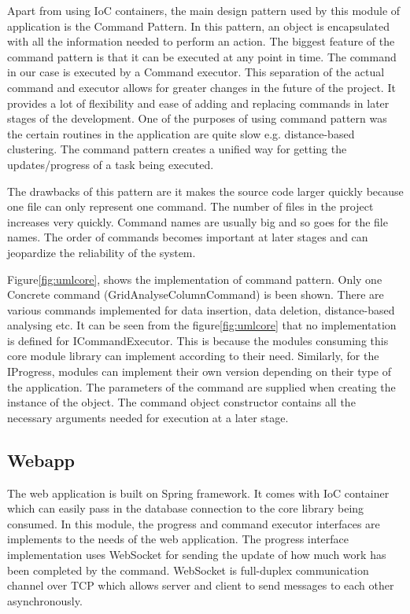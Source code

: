 Apart from using IoC containers, the main design pattern used by this module of application is the Command Pattern\cite{dupire2001command}. In this pattern, an object is encapsulated with all the information needed to perform an action. The biggest feature of the command pattern is that it can be executed at any point in time. The command in our case is executed by a Command executor. This separation of the actual command and executor allows for greater changes in the future of the project. It provides a lot of flexibility and ease of adding and replacing commands in later stages of the development. One of the purposes of using command pattern was the certain routines in the application are quite slow e.g. distance-based clustering. The command pattern creates a unified way for getting the updates/progress of a task being executed.

The drawbacks of this pattern are it makes the source code larger quickly because one file can only represent one command. The number of files in the project increases very quickly. Command names are usually big and so goes for the file names. The order of commands becomes important at later stages and can jeopardize the reliability of the system\cite{dupire2001command}.

Figure\ref{fig:umlcore}, shows the implementation of command pattern. Only one Concrete command (GridAnalyseColumnCommand) is been shown. There are various commands implemented for data insertion, data deletion, distance-based analysing etc. It can be seen from the figure\ref{fig:umlcore} that no implementation is defined for ICommandExecutor. This is because the modules consuming this core module library can implement according to their need. Similarly, for the IProgress, modules can implement their own version depending on their type of the application. The parameters of the command are supplied when creating the instance of the object. The command object constructor contains all the necessary arguments needed for execution at a later stage.

\subsection{Webapp}

The web application is built on Spring framework. It comes with IoC container which can easily pass in the database connection to the core library being consumed. In this module, the progress and command executor interfaces are implements to the needs of the web application. The progress interface implementation uses WebSocket for sending the update of how much work has been completed by the command. WebSocket is full-duplex communication channel over TCP which allows server and client to send messages to each other asynchronously.

